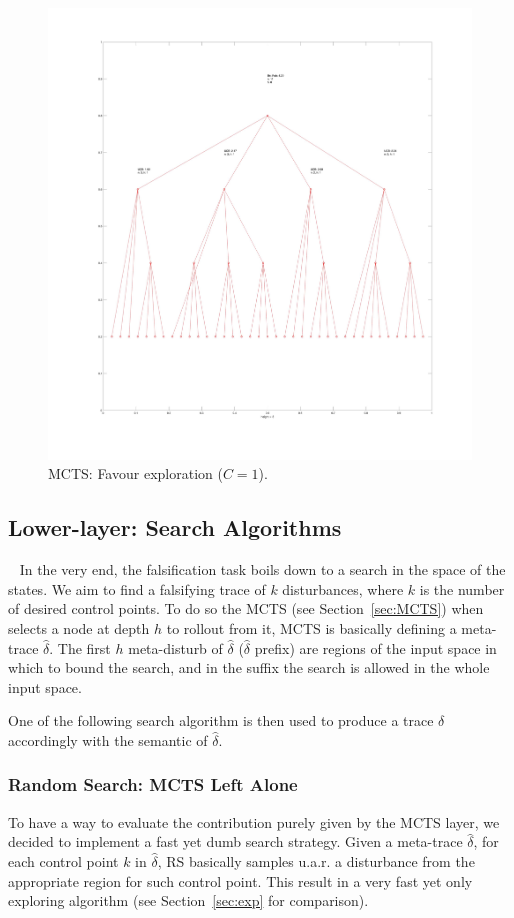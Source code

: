 \documentclass[11pt]{article}
\begin{document}
\begin{figure}
  \includegraphics[width=\linewidth]{img/c1.jpg}
  \caption{MCTS: Favour exploration ($C=1$).}
  \label{fig:c1}
\end{figure}

\subsection{Lower-layer: Search Algorithms}~\label{sec:srcalg}
In the very end, the falsification task boils down to a search in the space of the states. 
We aim to find a falsifying trace of $k$ disturbances, where $k$ is the number of desired control points. 
To do so the MCTS (see Section~\ref{sec:MCTS}) when selects a node at depth $h$ to rollout from it, MCTS is basically defining a meta-trace $\hat{\delta}$. The first $h$ meta-disturb of $\hat{\delta}$ ($\hat{\delta}$ prefix) are regions of the input space in which to bound the search, and in the suffix the search is allowed in the whole input space. 

One of the following search algorithm is then used to produce a trace $\delta$ accordingly with the semantic of $\hat{\delta}$.

\subsubsection{Random Search: MCTS Left Alone}
To have a way to evaluate the contribution purely given by the MCTS layer, we decided to implement a fast yet dumb search strategy.
Given a meta-trace $\hat{\delta}$, for each control point $k$ in $\hat{\delta}$, RS basically samples u.a.r. a disturbance from the appropriate region for such control point.
This result in a very fast yet only exploring algorithm (see Section~\ref{sec:exp} for comparison). 
\end{document}
